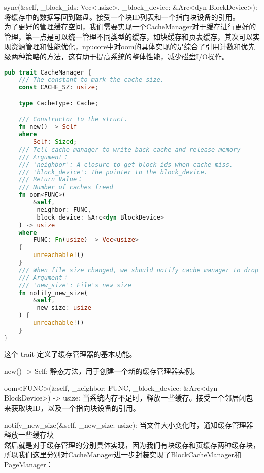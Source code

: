 sync(\&self, _block_ids: Vec<usize>, _block_device: \&Arc<dyn BlockDevice>): 将缓存中的数据写回到磁盘。接受一个块ID列表和一个指向块设备的引用。
\\[10pt]

为了更好的管理缓存空间，我们需要实现一个CacheManager对于缓存进行更好的管理，第一点是可以统一管理不同类型的缓存，如块缓存和页表缓存，其次可以实现资源管理和性能优化，npucore中对oom的具体实现的是综合了引用计数和优先级两种策略的方法，这有助于提高系统的整体性能，减少磁盘I/O操作。

\begin{lstlisting}[language={Rust},caption={CacheManager的实现}]
    pub trait CacheManager {
    /// The constant to mark the cache size.
    const CACHE_SZ: usize;

    type CacheType: Cache;

    /// Constructor to the struct.
    fn new() -> Self
    where
        Self: Sized;
    /// Tell cache manager to write back cache and release memory
    /// Argument：
    /// 'neighbor': A closure to get block ids when cache miss.
    /// 'block_device': The pointer to the block_device.
    /// Return Value：
    /// Number of caches freed
    fn oom<FUNC>(
        &self,
        _neighbor: FUNC,
        _block_device: &Arc<dyn BlockDevice>
    ) -> usize
    where
        FUNC: Fn(usize) -> Vec<usize>
    {
        unreachable!()
    }
    /// When file size changed, we should notify cache manager to drop some cache
    /// Argument：
    /// 'new_size': File's new size
    fn notify_new_size(
        &self,
        _new_size: usize
    ) {
        unreachable!()
    }
}
\end{lstlisting}
这个 trait 定义了缓存管理器的基本功能。

new() -> Self: 静态方法，用于创建一个新的缓存管理器实例。

oom<FUNC>(\&self, _neighbor: FUNC, _block_device: \&Arc<dyn BlockDevice>) -> usize: 当系统内存不足时，释放一些缓存。接受一个邻居闭包来获取块ID，以及一个指向块设备的引用。

notify_new_size(\&self, _new_size: usize): 当文件大小变化时，通知缓存管理器释放⼀些缓存块
\\[10pt]

然后就是对于缓存管理的分别具体实现，因为我们有块缓存和页缓存两种缓存块，所以我们这里分别对CacheManager进一步封装实现了BlockCacheManager和PageManager：

